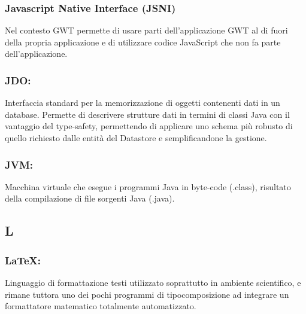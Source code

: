 \subsubsection*{Javascript Native Interface (JSNI)}
Nel contesto GWT permette di usare parti dell'applicazione GWT al di fuori della
propria applicazione e di utilizzare codice JavaScript che non fa parte
dell'applicazione.

\subsubsection*{JDO:}
Interfaccia standard per la memorizzazione di oggetti contenenti dati in un
database. Permette di descrivere strutture dati in termini di classi Java con il
vantaggio del type-safety, permettendo di applicare uno schema pi\`u
robusto di quello richiesto dalle entit\`a del Datastore e semplificandone la
gestione.

\subsubsection*{JVM:} Macchina virtuale che esegue i programmi Java in byte-code
(.class), risultato della compilazione di file sorgenti Java (.java).


\subsection*{\huge{L}}
\subsubsection*{LaTeX:} Linguaggio di formattazione testi utilizzato
soprattutto in ambiente scientifico, e rimane tuttora uno dei pochi programmi
di tipocomposizione ad integrare un formattatore matematico totalmente automatizzato.

